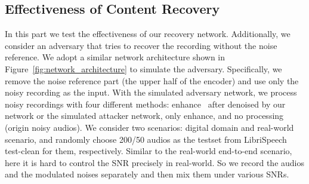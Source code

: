\begin{table}[h]
    \vspace{-3mm}
    \caption{Human perception result. Audios of the right two types are recorded in the over-the-air scenario.}
    \centering
    \label{tab:human_perception}
    \vspace{-7mm}
\end{table}

\subsection{Effectiveness of Content Recovery}
\label{subsec:effectiveness_of_content_recovery}
In this part we test the effectiveness of our recovery network. Additionally, we consider an adversary that tries to recover the recording without the noise reference. We adopt a similar network architecture shown in Figure~\ref{fig:network_architecture} to simulate the adversary. Specifically, we remove the noise reference part (the upper half of the encoder) and use only the noisy recording as the input. With the simulated adversary network, we process noisy recordings with four different methods: enhance~\cite{fullsubnetPlus} after denoised by our network or the simulated attacker network, only enhance, and no processing (origin noisy audios). We consider two scenarios: digital domain and real-world scenario, and randomly choose 200/50 audios as the testset from LibriSpeech test-clean for them, respectively. Similar to the real-world end-to-end scenario, here it is hard to control the SNR precisely in real-world. So we record the audios and the modulated noises separately and then mix them under various SNRs.

